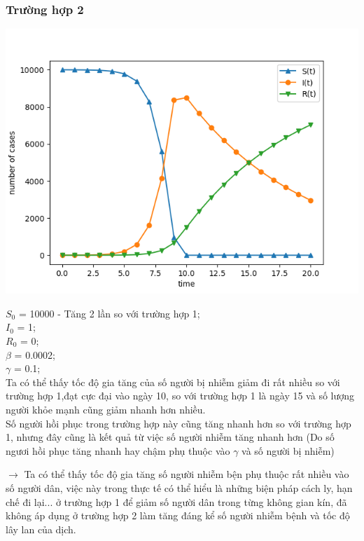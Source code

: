 \documentclass[a4paper]{article}
\begin{document}
\begin{flushleft}
\subsubsection{Trường hợp 2}
\begin{center}
\includegraphics{Images/10000 1 0 0_0002 0_1.png}
\end{center}
\begin{flushleft}
$S_0$ = 10000 - Tăng 2 lần so với trường hợp 1;\\
$I_0$ = 1;\\
$R_0$ = 0;\\
$\beta$ = 0.0002;\\
$\gamma$ = 0.1;\\
Ta có thể thấy tốc độ gia tăng của số người bị nhiễm giảm đi rất nhiều so với trường hợp 1,đạt cực đại vào ngày 10, so với trường hợp 1 là ngày 15 và số lượng người khỏe mạnh cũng giảm nhanh hơn nhiều.\\
Số người hồi phục trong trường hợp này cũng tăng nhanh hơn so với trường hợp 1, nhưng đây cũng là kết quả từ việc số người nhiễm tăng nhanh hơn (Do số ngươi hồi phục tăng nhanh hay chậm phụ thuộc vào $\gamma$ và số người bị nhiễm)
\end{flushleft}
$\longrightarrow$ Ta có thể thấy tốc độ gia tăng số người nhiễm bện phụ thuộc rất nhiều vào số người dân, việc này trong thực tế có thể hiểu là những biện pháp cách ly, hạn chế đi lại... ở trường hợp 1 để giảm số người dân trong từng không gian kín, đã không áp dụng ở trường hợp 2 làm tăng đáng kể số người nhiễm bệnh và tốc độ lây lan của dịch. 
\end{flushleft}
\end{document}

